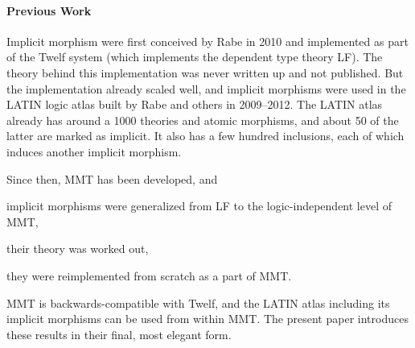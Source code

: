 \paragraph{Previous Work}
Implicit morphism were first conceived by Rabe in 2010 and implemented as part of the Twelf system \cite{twelf} (which implements the dependent type theory LF).
The theory behind this implementation was never written up and not published.
But the implementation already scaled well, and implicit morphisms were used in the LATIN logic atlas \cite{CHKMR:latinabs:11} built by Rabe and others in 2009--2012.
The LATIN atlas already has around a 1000 theories and atomic morphisms, and about 50 of the latter are marked as implicit.
It also has a few hundred inclusions, each of which induces another implicit morphism.

Since then, MMT has been developed, and
\begin{compactitem}
 \item implicit morphisms were generalized from LF to the logic-independent level of MMT,
 \item their theory was worked out,
 \item they were reimplemented from scratch as a part of MMT.
\end{compactitem}
MMT is backwards-compatible with Twelf, and the LATIN atlas including its implicit morphisms can be used from within MMT.
The present paper introduces these results in their final, most elegant form.


